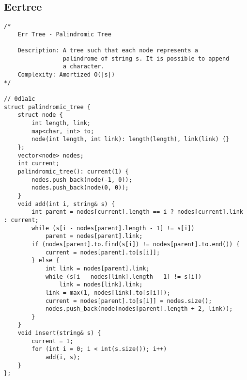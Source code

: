 \documentclass{article}
\begin{document}
\subsection{Eertree}
\begin{verbatim}
/*
    Err Tree - Palindromic Tree

    Description: A tree such that each node represents a 
                 palindrome of string s. It is possible to append
                 a character.
    Complexity: Amortized O(|s|)
*/

// 0d1a1c
struct palindromic_tree {
    struct node {
        int length, link;
        map<char, int> to;
        node(int length, int link): length(length), link(link) {}
    };
    vector<node> nodes;
    int current;
    palindromic_tree(): current(1) {
        nodes.push_back(node(-1, 0));
        nodes.push_back(node(0, 0));
    }
    void add(int i, string& s) {
        int parent = nodes[current].length == i ? nodes[current].link : current;
        while (s[i - nodes[parent].length - 1] != s[i])
            parent = nodes[parent].link;
        if (nodes[parent].to.find(s[i]) != nodes[parent].to.end()) {
            current = nodes[parent].to[s[i]];
        } else {
            int link = nodes[parent].link;
            while (s[i - nodes[link].length - 1] != s[i])
                link = nodes[link].link;
            link = max(1, nodes[link].to[s[i]]);
            current = nodes[parent].to[s[i]] = nodes.size();
            nodes.push_back(node(nodes[parent].length + 2, link));
        }
    }
    void insert(string& s) {
        current = 1;
        for (int i = 0; i < int(s.size()); i++)
            add(i, s);
    }
};
\end{verbatim}
\end{document}
